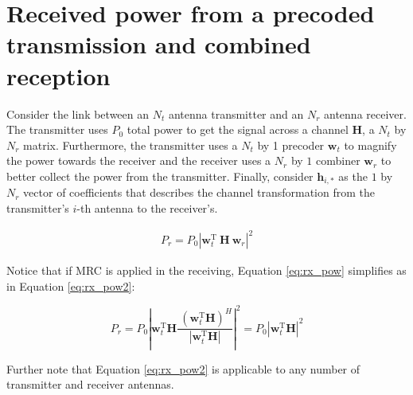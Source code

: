 \label{ap:b}



\section{Received power from a precoded transmission and combined reception}
Consider the link between an $N_t$ antenna transmitter and an $N_r$ antenna receiver. The transmitter uses $P_0$ total power to get the signal across a channel $\bm{H}$, a $N_t$ by $N_r$ matrix. Furthermore, the transmitter uses a $N_t$ by 1 precoder $\bm{w}_t$ to magnify the power towards the receiver and the receiver uses a $N_r$ by $1$ combiner $\bm{w}_r$ to better collect the power from the transmitter. Finally, consider $\bm{h}_{i,*}$ as the $1$ by $N_r$ vector of coefficients that describes the channel transformation from the transmitter's $i$-th antenna to the receiver's.


\begin{align} \label{eq:rx_pow}
    P_r = P_0 \left|\bm{w}_t^\text{T} \ \bm{H} \ \bm{w}_r \right|^2 
\end{align}


\begin{comment}
This is wrong!

    \begin{align}
        
    &= P_0 \sum_{i=1}^{N_t} \left|  \bm{w}_{t_i} \bm{h}_{i,*} \ \bm{w}_r \right|^2 = \\
    &= P_0 \mathlarger{\sum}_{i=1}^{N_t} \left| \bm{w}_{t_i} \right|^2 \sum_{j=1}^{N_r} \left| \bm{h}_{i,j} \ \bm{w}_{r_j} \right|^2 = \\
    &= d
    \end{align}
\end{comment}

Notice that if MRC is applied in the receiving, Equation \eqref{eq:rx_pow} simplifies as in Equation \eqref{eq:rx_pow2}:


\begin{equation} \label{eq:rx_pow2}
    P_r = P_0 \left| \bm{w}_t^\text{T} \bm{H}  \frac{\ \left(\bm{w}_t^\text{T} \bm{H}\right)^H}{\left| \bm{w}_t^\text{T} \bm{H}\right|}\right|^2 = P_0 \left| \bm{w}_t^\text{T} \bm{H}\right|^2
\end{equation}

Further note that Equation \eqref{eq:rx_pow2} is applicable to any number of transmitter and receiver antennas.

